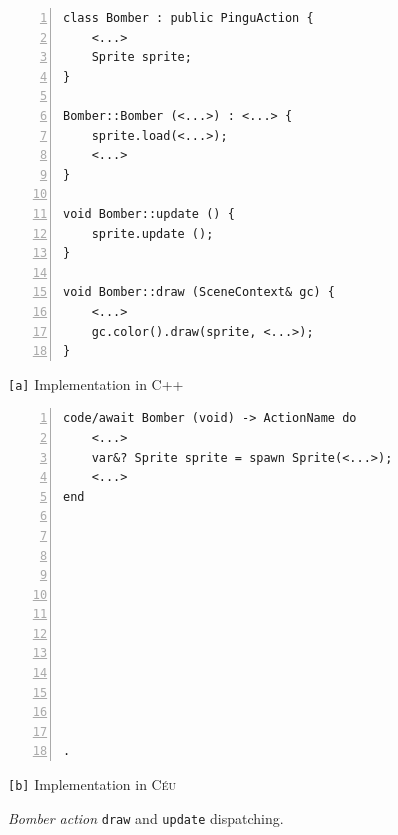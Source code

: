 \documentclass{vgtc}                          %
\newcommand{\CEU}{\textsc{C\'{e}u}\xspace}
\newcommand{\code}[1] {{\small{\texttt{#1}}}}
\newcommand{\ax}{\code{[a]}\xspace}
\newcommand{\bx}{\code{[b]}\xspace}
\begin{document}
\begin{figure}[t]
\begin{minipage}[t]{0.50\linewidth}
\begin{lstlisting}[numbers=left,xleftmargin=3em]
class Bomber : public PinguAction {
    <...>
    Sprite sprite;
}

Bomber::Bomber (<...>) : <...> {
    sprite.load(<...>);
    <...>
}

void Bomber::update () {
    sprite.update ();
}

void Bomber::draw (SceneContext& gc) {
    <...>
    gc.color().draw(sprite, <...>);
}
\end{lstlisting}
\centering\small{\ax Implementation in C++}
\end{minipage}
%
\begin{minipage}[t]{0.50\linewidth}
\begin{lstlisting}[numbers=left,xleftmargin=3em]
code/await Bomber (void) -> ActionName do
    <...>
    var&? Sprite sprite = spawn Sprite(<...>);
    <...>
end












.
\end{lstlisting}
\centering\small{\bx Implementation in \CEU}
\end{minipage}
\caption{ \emph{Bomber action} \code{draw} and \code{update} dispatching.
\label{lst.hier}
}
\end{figure}
\end{document}
